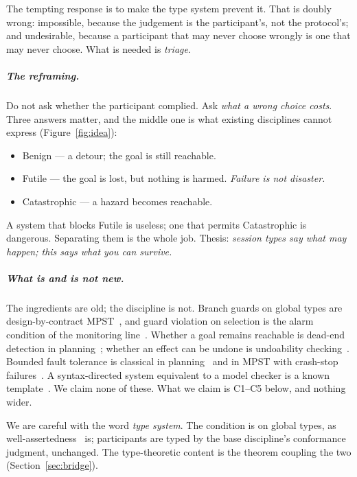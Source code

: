 \documentclass[a4paper,UKenglish,cleveref,autoref,thm-restate,anonymous]{lipics-v2021}
\newcommand{\Ben}{\textsf{Benign}}
\newcommand{\Fut}{\textsf{Futile}}
\newcommand{\Cat}{\textsf{Catastrophic}}
\begin{document}
The tempting response is to make the type system prevent it. That is doubly
wrong: impossible, because the judgement is the participant's, not the
protocol's; and undesirable, because a participant that may never choose
wrongly is one that may never choose. What is needed is \emph{triage}.

\subparagraph*{The reframing.}
Do not ask whether the participant complied. Ask \emph{what a wrong choice
costs}. Three answers matter, and the middle one is what existing disciplines
cannot express (Figure~\ref{fig:idea}):
\begin{itemize}
\item \Ben{} --- a detour; the goal is still reachable.
\item \Fut{} --- the goal is lost, but nothing is harmed. \emph{Failure is not
  disaster.}
\item \Cat{} --- a hazard becomes reachable.
\end{itemize}
A system that blocks \Fut{} is useless; one that permits \Cat{} is dangerous.
Separating them is the whole job. Thesis: \emph{session types say what may
happen; this says what you can survive.}

\subparagraph*{What is and is not new.}
The ingredients are old; the discipline is not. Branch guards on global types
are design-by-contract MPST~\cite{bocchi-concur10,gheri-ecoop22,vassor-ecoop24},
and guard violation on selection is the alarm condition of the monitoring
line~\cite{bocchi-forte13}. Whether a goal remains reachable is dead-end
detection in planning~\cite{steinmetz-aaai16,hoffmann-ecai14}; whether an
effect can be undone is undoability checking~\cite{daum-icaps16,morak-kr25}.
Bounded fault tolerance is classical in
planning~\cite{aineto-ecai23,domshlak-icaps13} and in MPST with crash-stop
failures~\cite{barwell-concur22,barwell-ecoop23}. A syntax-directed system
equivalent to a model checker is a known template~\cite{naik-palsberg,kobayashi-ong}.
We claim none of these. What we claim is C1--C5 below, and nothing wider.

We are careful with the word \emph{type system}. The condition is on global
types, as well-assertedness~\cite{bocchi-concur10} is; participants are typed by
the base discipline's conformance judgment, unchanged. The type-theoretic
content is the theorem coupling the two (Section~\ref{sec:bridge}).
\end{document}
